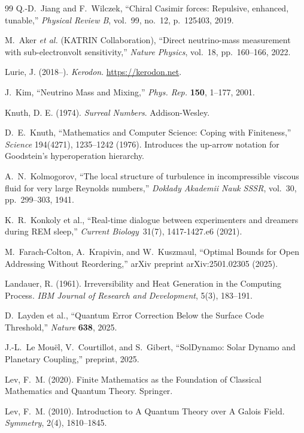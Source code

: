 \begin{thebibliography}{99}
Q.-D.~Jiang and F.~Wilczek,
``Chiral Casimir forces: Repulsive, enhanced, tunable,''
\emph{Physical Review B}, vol.~99, no.~12, p.~125403, 2019.

M.~Aker \emph{et al.} (KATRIN Collaboration), ``Direct neutrino-mass measurement with sub-electronvolt sensitivity,'' \emph{Nature Physics}, vol.~18, pp.~160--166, 2022.

 Lurie, J. (2018--). \emph{Kerodon}. \url{https://kerodon.net}.

J.~Kim, ``Neutrino Mass and Mixing,'' \emph{Phys. Rep.} \textbf{150}, 1--177, 2001.

 Knuth, D. E. (1974). \emph{Surreal Numbers}. Addison-Wesley.

D.~E.~Knuth,
``Mathematics and Computer Science: Coping with Finiteness,''
\emph{Science} 194(4271), 1235--1242 (1976).
Introduces the up-arrow notation for Goodstein's hyperoperation hierarchy.

A.~N.~Kolmogorov,
``The local structure of turbulence in incompressible viscous fluid for very large Reynolds numbers,''
\emph{Doklady Akademii Nauk SSSR}, vol.~30, pp.~299--303, 1941.

 K.~R.~Konkoly et al., ``Real-time dialogue between experimenters and dreamers during REM sleep,'' \emph{Current Biology}\ 31(7), 1417-1427.e6 (2021).

M.~Farach-Colton, A.~Krapivin, and W.~Kuszmaul,
``Optimal Bounds for Open Addressing Without Reordering,''
arXiv preprint arXiv:2501.02305 (2025).

 Landauer, R. (1961). Irreversibility and Heat Generation in the Computing Process. \emph{IBM Journal of Research and Development}, 5(3), 183--191.

D.~Layden et al., ``Quantum Error Correction Below the Surface Code Threshold,'' \emph{Nature} \textbf{638}, 2025.

J.-L.~Le Mou\"{e}l, V.~Courtillot, and S.~Gibert, ``SolDynamo: Solar Dynamo and Planetary Coupling,'' preprint, 2025.

Lev, F.~M. (2020).
Finite Mathematics as the Foundation of Classical Mathematics and Quantum Theory.
Springer.

Lev, F.~M. (2010).
Introduction to A Quantum Theory over A Galois Field.
\emph{Symmetry}, 2(4), 1810--1845.


\end{thebibliography}
